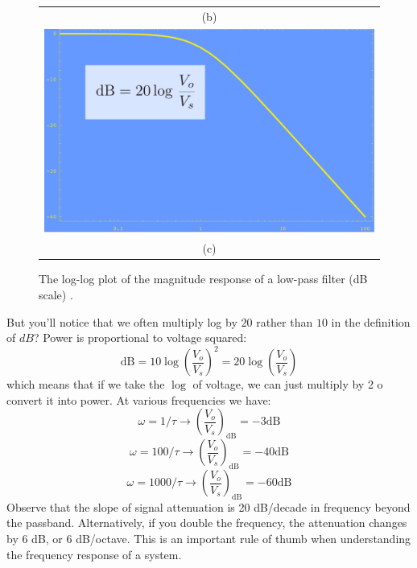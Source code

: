 \begin{figure}[tbp]
\begin{center}
\begin{tabular}{c}
(b) \\
\includegraphics[width=.6\columnwidth]{dB} \\
(c) \\
\end{tabular}
\end{center}
\caption{The log-log plot of the magnitude response of a low-pass filter (dB scale) . }
\label{fig:magphasedB}
\end{figure}
But you'll notice that we often multiply log by $20$ rather than $10$ in the definition of $dB$?   Power is proportional to voltage squared:
    \begin{equation}
        \mathrm{dB} = 10 \log\left( \frac{V_o}{V_s} \right)^2 = 20 \log\left( \frac{V_o}{V_s} \right)
    \end{equation}
which means that if we take the $\log$ of voltage, we can just multiply by 2 o convert it into power.
At various frequencies we have:
    \begin{equation}
        \omega = 1/\tau \rightarrow \left( \frac{V_o}{V_s} \right)_{\mathrm{dB}} = -3 \mathrm{dB}
    \end{equation}
    \begin{equation}
        \omega = 100/\tau \rightarrow \left( \frac{V_o}{V_s} \right)_{\mathrm{dB}} = -40 \mathrm{dB}
    \end{equation}
    \begin{equation}
        \omega = 1000/\tau \rightarrow \left( \frac{V_o}{V_s} \right)_{\mathrm{dB}} = -60 \mathrm{dB}
    \end{equation}
Observe that the slope of signal attenuation is 20 dB/decade in frequency beyond the passband.   Alternatively, if you double the frequency, the attenuation changes by 6 dB, or 6 dB/octave.  This is an important rule of thumb when understanding the frequency response of a system.
